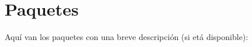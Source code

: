 \section{Paquetes}
Aquí van los paquetes con una breve descripción (si etá disponible)\+:\begin{DoxyCompactList}
\item{}
\end{DoxyCompactList}
